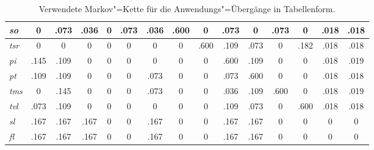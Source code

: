 \begin{table}
{\begin{tabular}{l|c|c|c|c|c|c|c|c|c|c|c|c|c|c}
    	\textit{\acs{so}}  &         0          &        .073        &       .036        &         0          &       .073        &       .036        &       .600        &         0          &       .073        &         0         &        .073        &         0          &       .018        &       .018        \\ \hline
    	\textit{\acs{tsr}} &         0          &         0          &         0         &         0          &         0         &         0         &         0         &        .600        &       .109        &       .073        &         0          &        .182        &       .018        &       .018        \\ \hline
    	\textit{\acs{pi}}  &        .145        &        .109        &         0         &         0          &         0         &         0         &         0         &         0          &       .600        &       .109        &         0          &         0          &       .018        &       .019        \\ \hline
    	\textit{\acs{pt}}  &        .109        &        .109        &         0         &         0          &         0         &       .073        &         0         &         0          &       .073        &       .600        &         0          &         0          &       .018        &       .018        \\ \hline
    	\textit{\acs{tms}} &         0          &        .145        &         0         &         0          &         0         &       .073        &         0         &         0          &       .036        &       .109        &        .600        &         0          &       .018        &       .019        \\ \hline
    	\textit{\acs{tvl}} &        .073        &        .109        &         0         &         0          &         0         &         0         &         0         &         0          &       .109        &       .073        &         0          &        .600        &       .018        &       .018        \\ \hline
    	\textit{\acs{sl}}  &        .167        &        .167        &       .167        &         0          &         0         &       .167        &         0         &         0          &       .167        &       .167        &         0          &         0          &         0         &         0         \\ \hline
    	\textit{\acs{fl}}  &        .167        &        .167        &       .167        &         0          &         0         &       .167        &         0         &         0          &       .167        &       .167        &         0          &         0          &         0         &         0
    \end{tabular}}
    \caption
    {Verwendete Markov"=Kette für die Anwendungs"=Übergänge in Tabellenform.}
    \label{tab:transMatrix}
\end{table}


